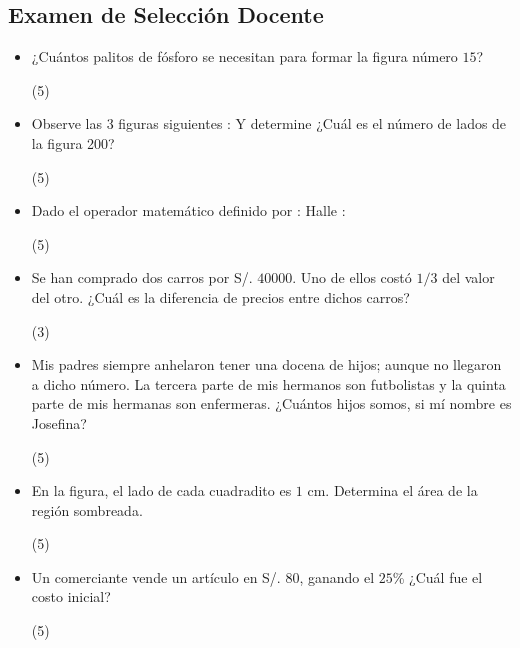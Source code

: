 \documentclass[10pt, twocolumn, landscape, a4paper]{article}
\begin{document}
\subsection*{Examen de Selección Docente}
\begin{itemize}
\item{¿Cuántos palitos de fósforo se necesitan para formar la figura número $15$?
\begin{tasks}(5)
\end{tasks}
}
\item{Observe las $3$ figuras siguientes :
Y determine ¿Cuál es el número de lados de la figura 200?
\begin{tasks}(5)
\end{tasks}
}
\item{Dado el operador matemático definido por :
Halle :
\begin{tasks}(5)
\end{tasks}}
\item{Se han comprado dos carros por S/. $40 000$. Uno de ellos costó $1/3$ del valor del otro. ¿Cuál es la diferencia de precios entre dichos carros?
\begin{tasks}(3)
\end{tasks}
}
\item{Mis padres siempre anhelaron tener una docena de hijos; aunque no llegaron a dicho número. La tercera parte de mis hermanos son futbolistas y la quinta parte de mis hermanas son enfermeras. ¿Cuántos hijos somos, si mí nombre es Josefina?
\begin{tasks}(5)
\end{tasks}
}
\item{En la figura, el lado de cada cuadradito es $1$ cm. Determina el área de la región sombreada.
\begin{tasks}(5)
\end{tasks}
}
\item{Un comerciante vende un artículo en S/. $80$, ganando el $25$\% ¿Cuál fue el costo inicial?
\begin{tasks}(5)

\end{tasks}}
\end{itemize}
\end{document}
